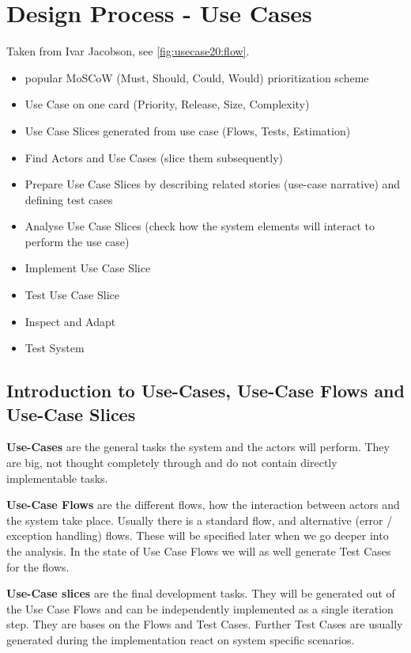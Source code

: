 {\color{gray}
\section{Design Process - Use Cases}
Taken from Ivar Jacobson, see \autoref{fig:usecase20:flow}.
\begin{itemize}
	\item popular MoSCoW (Must, Should, Could, Would) prioritization scheme
	\item Use Case on one card (Priority, Release, Size, Complexity)
	\item Use Case Slices generated from use case (Flows, Tests, Estimation)
	\item Find Actors and Use Cases (slice them subsequently)
	\item Prepare Use Case Slices by describing related stories (use-case narrative) and defining test cases
	\item Analyse Use Case Slices (check how the system elements will interact to perform the use case)
	\item Implement Use Case Slice
	\item Test Use Case Slice
	\item Inspect and Adapt
	\item Test System
\end{itemize}

\subsection{Introduction to Use-Cases, Use-Case Flows and Use-Case Slices}

\textbf{Use-Cases} are the general tasks the system and the actors will perform. They are big, not thought completely through and do not contain directly implementable tasks.

\textbf{Use-Case Flows} are the different flows, how the interaction between actors and the system take place. Usually there is a standard flow, and alternative (error / exception handling) flows. These will be specified later when we go deeper into the analysis. In the state of Use Case Flows we will as well generate Test Cases for the flows. 

\textbf{Use-Case slices} are the final development tasks. They will be generated out of the Use Case Flows and can be independently implemented as a single iteration step. They are bases on the Flows and Test Cases. Further Test Cases are usually generated during the implementation react on system specific scenarios.


}
